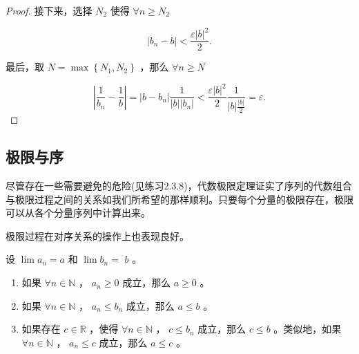 \begin{proof}
接下来，选择 \({N}_{2}\) 使得 \(\forall n \geq  {N}_{2}\) 

\[
\left| {{b}_{n} - b}\right|  < \frac{\varepsilon {\left| b\right| }^{2}}{2}.
\]

最后，取 \(N = \max \left\{  {{N}_{1},{N}_{2}}\right\}\) ，那么 \(\forall n \geq  N\) 

\[
\left| {\frac{1}{{b}_{n}} - \frac{1}{b}}\right|  = \left| {b - {b}_{n}}\right| \frac{1}{\left| b\right| \left| {b}_{n}\right| } < \frac{\varepsilon {\left| b\right| }^{2}}{2}\frac{1}{\left| b\right| \frac{\left| b\right| }{2}} = \varepsilon .
\]

\end{proof}

\subsection{极限与序}

尽管存在一些需要避免的危险(见练习2.3.8)，代数极限定理证实了序列的代数组合与极限过程之间的关系如我们所希望的那样顺利。只要每个分量的极限存在，极限可以从各个分量序列中计算出来。

极限过程在对序关系的操作上也表现良好。

\begin{Thm}[序极限定理]
  \label{thm:2.3.4}
设 \(\lim {a}_{n} = a\) 和 \(\lim {b}_{n} =\)  \(b\) 。
\begin{enumerate}[label = (\roman*)]
\item\label{item:2.3.5} 如果 \(\forall n \in  \mathbb{N}\) ， \({a}_{n} \geq  0\) 成立，那么 \(a \geq  0\) 。
\item \label{item:2.3.6}如果 \(\forall n \in  \mathbb{N}\) ， \({a}_{n} \leq  {b}_{n}\) 成立，那么 \(a \leq  b\) 。
\item \label{item:2.3.7}如果存在 \(c \in  \mathbb{R}\) ，使得 \(\forall n \in  \mathbb{N}\) ， \(c \leq  {b}_{n}\) 成立，那么 \(c \leq  b\) 。类似地，如果 \(\forall n \in  \mathbb{N}\) ， \({a}_{n} \leq  c\) 成立，那么 \(a \leq  c\) 。  
\end{enumerate}
\end{Thm}

